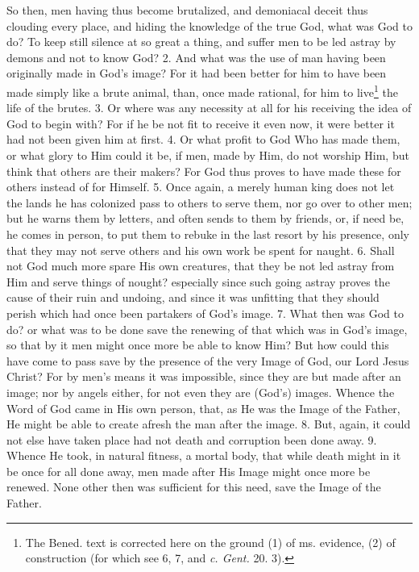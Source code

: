 So then, men having thus become brutalized, and demoniacal deceit thus clouding every place, and hiding the knowledge of the true God, what was God to do? To keep still silence at so great a thing, and suffer men to be led astray by demons and not to know God? 2. And what was the use of man having been originally made in God’s image? For it had been better for him to have been made simply like a brute animal, than, once made rational, for him to live\footnote{The Bened. text is corrected here on the ground (1) of ms. evidence, (2) of construction (for which see 6, 7, and \emph{c. Gent.} 20. 3).} the life of the brutes. 3. Or where was any necessity at all for his receiving the idea of God to begin with? For if he be not fit to receive it even now, it were better it had not been given him at first. 4. Or what profit to God Who has made them, or what glory to Him could it be, if men, made by Him, do not worship Him, but think that others are their makers? For God thus proves to have made these for others instead of for Himself. 5. Once again, a merely human king does not let the lands he has colonized pass to others to serve them, nor go over to other men; but he warns them by letters, and often sends to them by friends, or, if need be, he comes in person, to put them to rebuke in the last resort by his presence, only that they may not serve others and his own work be spent for naught. 6. Shall not God much more spare His own creatures, that they be not led astray from Him and serve things of nought? especially since such going astray proves the cause of their ruin and undoing, and since it was unfitting that they should perish which had once been partakers of God’s image. 7. What then was God to do? or what was to be done save the renewing of that which was in God’s image, so that by it men might once more be able to know Him? But how could this have come to pass save by the presence of the very Image of God, our Lord Jesus Christ? For by men’s means it was impossible, since they are but made after an image; nor by angels either, for not even they are (God’s) images. Whence the Word of God came in His own person, that, as He was the Image of the Father, He might be able to create afresh the man after the image. 8. But, again, it could not else have taken place had not death and corruption been done away. 9. Whence He took, in natural fitness, a mortal body, that while death might in it be once for all done away, men made after His Image might once more be renewed. None other then was sufficient for this need, save the Image of the Father.

